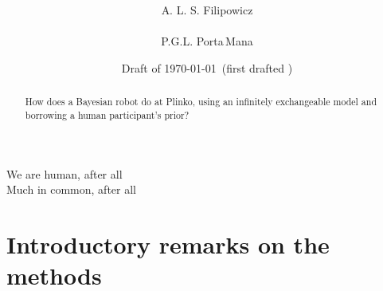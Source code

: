 \documentclass[\ifafour a4paper,12pt,\else a5paper,10pt,\fi%
onecolumn,oneside,article,%
british%
]{memoir}
\title{\propertitle%
}
\author{\hspace*{\stretch{1}}%
\parbox[t]{0.3\linewidth}{\protect\centering%
A. L. S. Filipowicz\\%
{\footnotesize\epost{\email{***}{***}}}}%
\hspace*{\stretch{1}}%
\parbox[t]{0.3\linewidth}{\protect\centering%
P.G.L. Porta\,Mana\\%
{\footnotesize%
\epost{\email{pgl}{portamana.org}}}%
}%
\hspace*{\stretch{1}}%
}
\date{Draft of \today\ (first drafted \firstdraft)}
\theoremstyle{remark}
\theoremstyle{innote}
\newcommand*{\citep}{\parencites}
\newcommand*{\asudedication}[1]{%
{\par\centering\textit{#1}\par}}
\renewcommand*{\|}{\mathpunct{|}}
\begin{document}
\captiondelim{\quad}\captionnamefont{\footnotesize}\captiontitlefont{\footnotesize}
\frenchspacing

\maketitle
\ifpublic
\abstractrunin
\abslabeldelim{}
\renewcommand*{\abstractname}{}
\setlength{\absleftindent}{0pt}
\setlength{\absrightindent}{0pt}
\setlength{\abstitleskip}{-\absparindent}
\begin{abstract}%
  \noindent How does a Bayesian robot do at Plinko, using an infinitely
  exchangeable model and borrowing a human participant's prior?
\end{abstract}\fi

\frenchspacing

\setlength{\epigraphwidth}{.6\columnwidth}
\epigraphfontsize{\footnotesize}
\setlength{\epigraphrule}{0pt}
\setlength{\beforeepigraphskip}{0pt}
\setlength{\afterepigraphskip}{0pt}
\epigraph{We are human, after all\\
  Much in common, after all}{\citep{daftpunk2005b}}




\section{Introductory remarks on the methods}
\label{sec:method_remarks}
\end{document}
